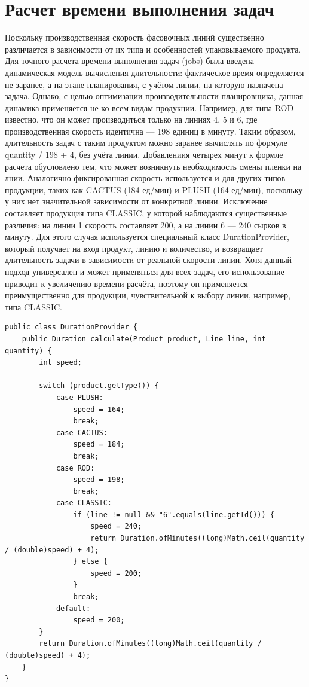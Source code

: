 \section{Расчет времени выполнения задач}

Поскольку производственная скорость фасовочных линий существенно различается в зависимости от их типа и особенностей упаковываемого продукта. Для точного расчета времени выполнения задач (jobs) была введена динамическая модель вычисления длительности: фактическое время определяется не заранее, а на этапе планирования, с учётом линии, на которую назначена задача. Однако, с целью оптимизации производительности планировщика, данная динамика применяется не ко всем видам продукции. Например, для типа ROD известно, что он может производиться только на линиях 4, 5 и 6, где производственная скорость идентична — 198 единиц в минуту. Таким образом, длительность задач с таким продуктом можно заранее вычислять по формуле quantity / 198 + 4, без учёта линии. Добавлениия четырех минут к формле расчета обусловлено тем, что может возникнуть необходимость смены пленки на лнии. Аналогично фиксированная скорость используется и для других типов продукции, таких как CACTUS (184 ед/мин) и PLUSH (164 ед/мин), поскольку у них нет значительной зависимости от конкретной линии. Исключение составляет продукция типа CLASSIC, у которой наблюдаются существенные различия: на линии 1 скорость составляет 200, а на линии 6 — 240 сырков в минуту. Для этого случая используется специальный класс DurationProvider, который получает на вход продукт, линию и количество, и возвращает длительность задачи в зависимости от реальной скорости линии. Хотя данный подход универсален и может применяться для всех задач, его использование приводит к увеличению времени расчёта, поэтому он применяется преимущественно для продукции, чувствительной к выбору линии, например, типа CLASSIC.

\vspace{3cm}
\begin{lstlisting}[caption={класс DurationProvider}, label={lst:classDurationProvider}]
public class DurationProvider {
    public Duration calculate(Product product, Line line, int quantity) {
        int speed;

        switch (product.getType()) {
            case PLUSH:
                speed = 164;
                break;
            case CACTUS:
                speed = 184;
                break;
            case ROD:
                speed = 198;
                break;
            case CLASSIC:
                if (line != null && "6".equals(line.getId())) {
                    speed = 240;
                    return Duration.ofMinutes((long)Math.ceil(quantity / (double)speed) + 4);
                } else {
                    speed = 200;
                }
                break;
            default:
                speed = 200;
        }
        return Duration.ofMinutes((long)Math.ceil(quantity / (double)speed) + 4);
    }
}
\end{lstlisting}

